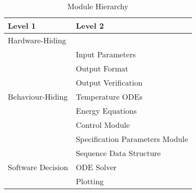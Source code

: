 \documentclass[12pt, titlepage]{article}
\begin{document}
\begin{table}[h!]
\centering
\begin{tabular}{p{} p{}}
\toprule
\textbf{Level 1} & \textbf{Level 2}\\
\midrule

{Hardware-Hiding} & ~ \\
\midrule

\multirow{7}{0.3\textwidth}{Behaviour-Hiding} & Input Parameters\\
& Output Format\\
& Output Verification\\
& Temperature ODEs\\
& Energy Equations\\ 
& Control Module\\
& Specification Parameters Module\\
\midrule

\multirow{3}{0.3\textwidth}{Software Decision} & {Sequence Data Structure}\\
& ODE Solver\\
& Plotting\\
\bottomrule

\end{tabular}
\caption{Module Hierarchy}
\label{TblMH}
\end{table}

\newpage
~\newpage
\end{document}
